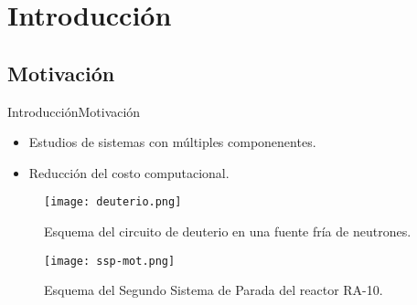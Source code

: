\section{Introducción}

\subsection{Motivación}

\begin{frame}{Introducción}{Motivación}
  \begin{itemize}
  \item {
    Estudios de sistemas con múltiples componenentes.
  }
  \item {
    Reducción del costo computacional.
  }
  \end{itemize}
  
  

  \begin{figure}[ht]
    \begin{minipage}{0.4\linewidth}
      \centering
      \texttt{[image: deuterio.png]}
      \caption[]{Esquema del circuito de deuterio en una fuente fría de neutrones.}
      \label{fuente-fria-mot}	
    \end{minipage}
    \begin{minipage}{0.58\linewidth}
      \centering
      \texttt{[image: ssp-mot.png]}
      \caption[]{Esquema del Segundo Sistema de Parada del reactor RA-10.}
      \label{ssp-mot}	
    \end{minipage}
    \label{aasdasd}
  \end{figure}
  
\end{frame}

